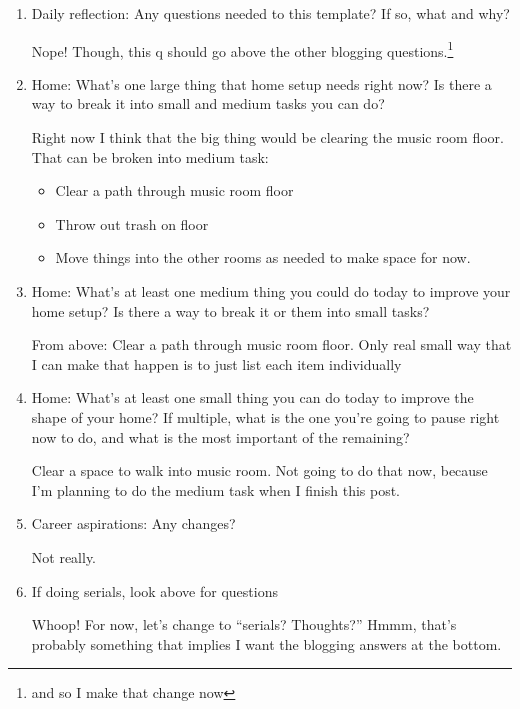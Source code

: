 \documentclass[12pt]{article}
\newcommand{\say}[1]{``#1''}
\renewcommand{\,}{\textsuperscript{,}}
\begin{document}
\begin{enumerate}
\item Daily reflection: Any questions needed to this template? If so, what and why?

Nope!  
Though, this q should go above the other blogging questions.\footnote{and so I make that change now}

\item Home: What's one large thing that home setup needs right now? Is there a way to break it into small and medium tasks you can do?

Right now I think that the big thing would be clearing the music room floor.  
That can be broken into medium task:

\begin{itemize}

\item Clear a path through music room floor

\item Throw out trash on floor

\item Move things into the other rooms as needed to make space for now.

\end{itemize}

\item Home: What's at least one medium thing you could do today to improve your home setup? Is there a way to break it or them into small tasks?

From above: Clear a path through music room floor.  
Only real small way that I can make that happen is to just list each item individually

\item Home: What's at least one small thing you can do today to improve the shape of your home? If multiple, what is the one you're going to pause right now to do, and what is the most important of the remaining?

Clear a space to walk into music room.  
Not going to do that now, because I'm planning to do the medium task when I finish this post.

\item Career aspirations: Any changes?

Not really.

\item If doing serials, look above for questions

Whoop! For now, let's change to \say{serials? Thoughts?}  
Hmmm, that's probably something that implies I want the blogging answers at the bottom.


\end{enumerate}
\end{document}
